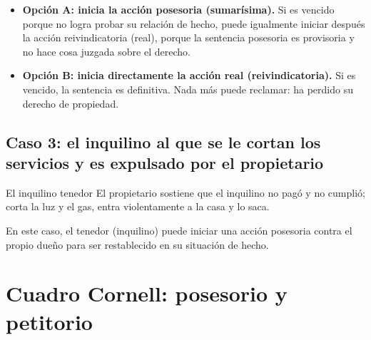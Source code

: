 \documentclass[12pt,oneside]{book}
\begin{document}
\begin{itemize}
    \item \textbf{Opción A: inicia la acción posesoria (sumarísima).} Si es vencido porque no logra probar su relación de hecho, puede igualmente iniciar después la acción reivindicatoria (real), porque la sentencia posesoria es provisoria y no hace cosa juzgada sobre el derecho.
    \item \textbf{Opción B: inicia directamente la acción real (reivindicatoria).} Si es vencido, la sentencia es definitiva. Nada más puede reclamar: ha perdido su derecho de propiedad.
\end{itemize}

\subsection{Caso 3: el inquilino al que se le cortan los servicios y es expulsado por el propietario}

\begin{example}{El inquilino tenedor}
El propietario sostiene que el inquilino no pagó y no cumplió; corta la luz y el gas, entra violentamente a la casa y lo saca.
\end{example}

En este caso, el tenedor (inquilino) puede iniciar una acción posesoria contra el propio dueño para ser restablecido en su situación de hecho.

\section*{Cuadro Cornell: posesorio y petitorio}
\end{document}
